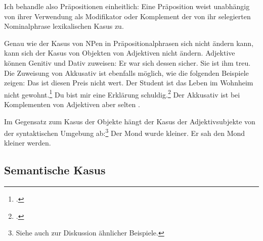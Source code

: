 Ich behandle also Präpositionen einheitlich: Eine Präposition weist unabhängig von ihrer
Verwendung als Modifikator oder Komplement der von ihr selegierten Nominalphrase
lexikalischen Kasus zu.
%
%

Genau wie der Kasus von NPen in Präpositionalphrasen sich nicht ändern kann, kann
sich der Kasus von Objekten von Adjektiven nicht ändern.
Adjektive können Genitiv und Dativ zuweisen:
\eal
\ex Er war sich dessen sicher.
\ex Sie ist ihm treu.
\zl
Die Zuweisung von Akkusativ ist ebenfalls möglich, wie die folgenden Beispiele zeigen:
\eal
\ex Das ist diesen Preis nicht wert.
\ex Der Student ist das Leben im Wohnheim nicht gewohnt.\footnote{
        .
      }
\ex Du bist mir eine Erklärung schuldig.\footnote{
        .
      }
\zl
Der Akkusativ ist bei Komplementen von Adjektiven aber selten \citep*[, Fn.\,3]{Haider85b}.

Im Gegensatz zum Kasus der Objekte hängt der Kasus der Adjektivsubjekte von der syntaktischen
Umgebung ab:\footnote{
  Siehe auch  zur Diskussion ähnlicher Beispiele.%
}
\eal
\ex Der Mond wurde kleiner.
\ex Er sah den Mond kleiner werden.
\zl


\subsection{Semantische Kasus}
\label{sec-sem-kasus}

